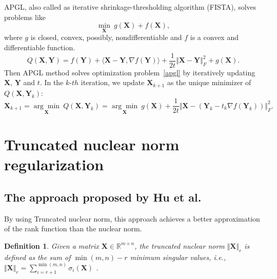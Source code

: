 \documentclass{article}
\newtheorem{definition}{Definition}[section]
\begin{document}
{APGL, also called as iterative shrinkage-thresholding algorithm (FISTA), solves problems like
\begin{equation}
    \underset{\mathbf X}{\min} \ g(\mathbf X)+f(\mathbf X),
    \label{apgl}
\end{equation}
where $g$ is closed, convex, possibly, nondifferentiable and $f$ is a convex and differentiable function. 
\begin{equation}
    Q(\mathbf X,\mathbf Y) = f(\mathbf Y)+\langle \mathbf X - \mathbf Y, \nabla f(\mathbf Y) \rangle + \frac{1}{2t}\Vert \mathbf X - \mathbf Y \Vert_F^2 +g(\mathbf X).
\end{equation}
Then APGL method solves optimization problem~\eqref{apgl} by iteratively updating $\mathbf X$, $\mathbf Y$ and $t$. In the $k$-$th$ iteration, we update $\mathbf X_{k+1}$ as the unique minimizer of $Q(\mathbf X, \mathbf Y_k)$:
\begin{equation}
    \mathbf X_{k+1} = \underset{\mathbf X}{\arg\min}\ Q(\mathbf X, \mathbf Y_k) = \underset{\mathbf X}{\arg\min}\ g(\mathbf X)+\frac{1}{2t}\Vert \mathbf X- (\mathbf Y_k -t_k \nabla f(\mathbf Y_k))\Vert_F^2.
\end{equation}


\section{Truncated nuclear norm regularization}
\label{s3}

\subsection{The approach proposed by Hu et al.}
By using Truncated nuclear norm, this approach achieves a better approximation of the rank function than the nuclear norm.
\begin{definition}
    Given a matrix $\mathbf X \in \mathbb{R}^{m \times n}$, the truncated nuclear norm $\Vert\mathbf X \Vert_r$ is defined as the sum of $\min(m,n) - r$  minimum singular values, i.e., $\Vert\mathbf X \Vert_r = \sum_{i=r+1}^{\min(m,n)} \sigma_i(\mathbf X)$ .
\end{definition}

}
\end{document}
